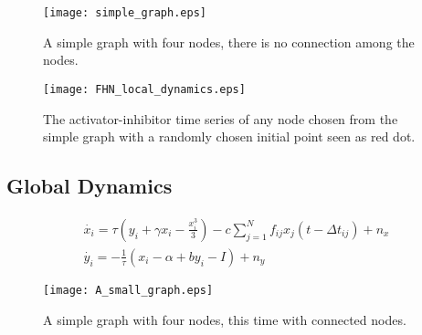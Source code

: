 \documentclass[12pt]{article}
\begin{document}
\begin{figure}[h!]
	\centering
	\texttt{[image: simple\_graph.eps]}
		\caption{A simple graph with four nodes, there is no connection among the nodes.}
\end{figure}


\begin{figure}[h!]
	\centering
	\texttt{[image: FHN\_local\_dynamics.eps]}
		\caption{The activator-inhibitor time series of any node chosen from the simple graph with a randomly chosen initial point seen as red dot.}
\end{figure}

\newpage

\subsection{Global Dynamics}

\begin{subequations}
 \begin{align}\dot{x_i} = \tau (y_i + \gamma x_i - \frac{x_i^3}{3}) -c \sum_{j=1}^N f_{ij}x_j(t - \Delta t_{ij}) +n_x \label{eqn: frobenius 17}\\  \dot{y_i} = -\frac{1}{\tau} (x_i - \alpha + b y_i - I ) +n_y \label{eqn: frobenius 18}   \end{align} 
\end{subequations}


\begin{figure}[h!]
	\centering
	\texttt{[image: A\_small\_graph.eps]}
		\caption{A simple graph with four nodes, this time with connected nodes.}
\end{figure}
\end{document}
